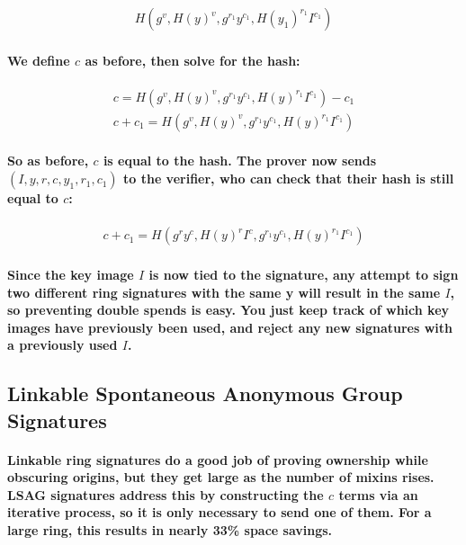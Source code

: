 \documentclass{article}
\begin{document}
\begin{eqnarray}
  H(g^v, H(y)^v, g^{r_1} y^{c_1}, H(y_1)^{r_1} I^{c_1})
\end{eqnarray}

\paragraph{We define $c$ as before, then solve for the hash:}

\begin{eqnarray}
  c = H(g^v, H(y)^v, g^{r_1} y^{c_1}, H(y)^{r_1} I^{c_1}) - c_1\\
  c + c_1 = H(g^v, H(y)^v, g^{r_1} y^{c_1}, H(y)^{r_1} I^{c_1})
\end{eqnarray}

\paragraph{So as before, $c$ is equal to the hash.  The prover now sends $(I, y, r, c, y_1, r_1, c_1)$ to the verifier, who can check that their hash is still equal to $c$:}

\begin{eqnarray}
  c + c_1 = H(g^r y^c, H(y)^r I^c, g^{r_1} y^{c_1}, H(y)^{r_1} I^{c_1})
\end{eqnarray}

\paragraph{Since the key image $I$ is now tied to the signature, any attempt to sign two different ring signatures with the same y will result in the same $I$, so preventing double spends is easy.  You just keep track of which key images have previously been used, and reject any new signatures with a previously used $I$.}


\subsection{Linkable Spontaneous Anonymous Group Signatures}

\paragraph{Linkable ring signatures do a good job of proving ownership while obscuring origins, but they get large as the number of mixins rises. LSAG signatures address this by constructing the $c$ terms via an iterative process, so it is only necessary to send one of them.  For a large ring, this results in nearly 33\% space savings.}
\end{document}
